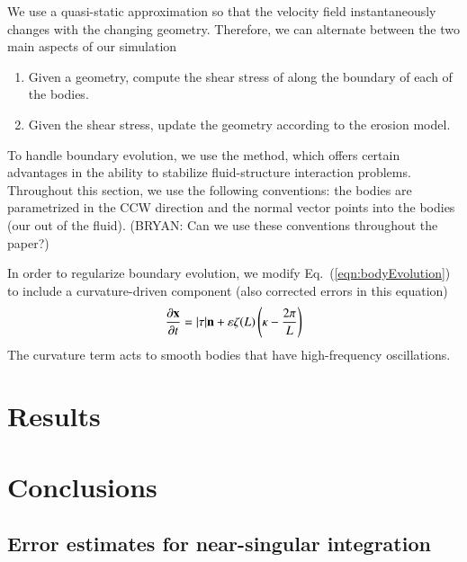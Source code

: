 \documentclass[preprint, 10pt]{elsarticle}
\begin{document}
We use a quasi-static approximation so that the velocity field
instantaneously changes with the changing geometry.  Therefore, we can
alternate between the two main aspects of our simulation
\begin{enumerate}
  \item Given a geometry, compute the shear stress of along the boundary
    of each of the bodies.
  \item Given the shear stress, update the geometry according to the
    erosion model.
\end{enumerate}

To handle boundary evolution, we use the \thL    method, which offers certain advantages in the ability to stabilize fluid-structure interaction problems. Throughout this section, we use the following conventions: the bodies are parametrized in the CCW direction and the normal vector points into the bodies (our out of the fluid). (BRYAN: Can we use these conventions throughout the paper?)

In order to regularize boundary evolution, we modify
Eq.~(\ref{eqn:bodyEvolution}) to include a curvature-driven component
(also corrected errors in this equation)
\begin{equation}
\frac{\partial {\mathbf{x}}}{\partial t} = |\tau| {\mathbf{n}} + \varepsilon \zeta(L) \left(\kappa - \frac{2 \pi}{L} \right)
\end{equation}
The curvature term acts to smooth bodies that have high-frequency oscillations.




\section{Results\label{s:results}} 

\section{Conclusions\label{s:conclusions}}


\begin{appendices}
\section{Error estimates for near-singular integration \label{A:AppendixA}} 
\end{appendices}


 

\end{document}
